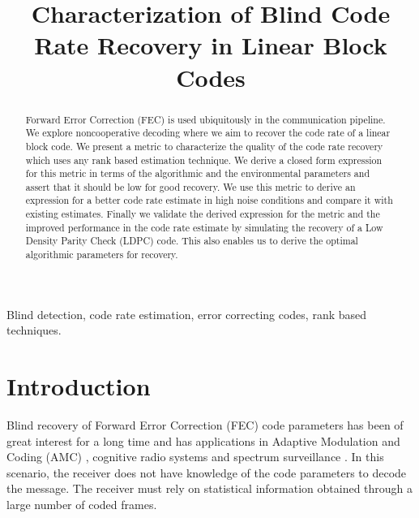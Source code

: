 \documentclass[conference]{IEEEtran}
\begin{document}
\title{Characterization of Blind Code Rate Recovery in Linear Block Codes}

\author{
\and
{}
}

\maketitle

\begin{abstract} 
Forward Error Correction (FEC) is used ubiquitously in the communication pipeline. We explore noncooperative decoding where we aim to recover the code rate of a linear block code. We present a metric to characterize the quality of the code rate recovery which uses any rank based estimation technique. We derive a closed form expression for this metric in terms of the algorithmic and the environmental parameters and assert that it should be low for good recovery. We use this metric to derive an expression for a better code rate estimate in high noise conditions and compare it with existing estimates. Finally we validate the derived expression for the metric and the improved performance in the code rate estimate by simulating the recovery of a Low Density Parity Check (LDPC) code. This also enables us to derive the optimal algorithmic parameters for recovery. 
\end{abstract}

\begin{IEEEkeywords}
Blind detection, code rate estimation, error correcting codes, rank based techniques.
\end{IEEEkeywords}

\section{Introduction}
Blind recovery of Forward Error Correction (FEC) code parameters has been of great interest for a long time and has  applications in Adaptive Modulation and Coding (AMC) \cite{amc}, cognitive radio systems \cite{crs} and spectrum surveillance \cite{military}. In this scenario, the  receiver does not have knowledge of the code parameters to decode the message. The receiver  must rely on statistical information obtained through a large number of coded frames.
\end{document}
